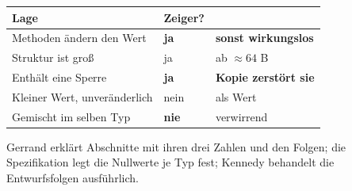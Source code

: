 \begin{aufgabe}
\begin{warnung}
\begin{center}
\renewcommand{\arraystretch}{1.5}
\begin{tabular}{@{}P{3.0cm}P{2.2cm}P{2.8cm}@{}}
\toprule
\textbf{Lage} & \textbf{Zeiger?} & \\
\midrule
Methoden ändern den Wert & \textcolor{gruen}{\textbf{ja}} & \textbf{sonst wirkungslos}\\
Struktur ist groß & \textcolor{gruen}{ja} & ab $\approx64$ B\\
Enthält eine Sperre & \textcolor{gruen}{\textbf{ja}} & \textcolor{akzent}{\textbf{Kopie zerstört sie}}\\
Kleiner Wert, unveränderlich & \textcolor{akzent}{nein} & \textcolor{gruen}{als Wert}\\
Gemischt im selben Typ & \textcolor{akzent}{\textbf{nie}} & \textcolor{akzent}{verwirrend}\\
\bottomrule
\end{tabular}
\end{center}

\begin{center}
\begin{minipage}{0.88\textwidth}
\end{minipage}
\end{center}

\begin{center}
\end{center}
\end{warnung}
\end{aufgabe}
\vspace{-4pt}
\noindent Gerrand erklärt Ab\-schnit\-te mit ihren drei Zahlen und den Folgen; die Spe\-zi\-fi\-ka\-tion legt die Null\-wer\-te je Typ fest; Kennedy behandelt die Ent\-wurfs\-fol\-gen aus\-führ\-lich.
